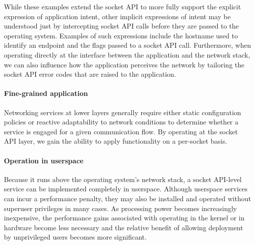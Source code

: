 While these examples extend the socket API to more fully support the 
explicit expression of application intent, other implicit expressions of intent 
may be understood just by intercepting socket API calls before they are passed 
to the operating system. Examples of such expressions include the hostname
used to identify an endpoint and the flags passed to a socket API call.
Furthermore, when operating directly at the interface between the application
and the network stack, we can also influence how the application perceives
the network by tailoring the socket API error codes that are raised to the 
application. 

\paragraph{Fine-grained application}
Networking services at lower layers generally require 
either static configuration policies
or reactive adaptability to network conditions
to determine whether a service is engaged for a given 
communication flow. By operating at the socket API layer, 
we gain the ability to apply functionality 
on a per-socket basis.


\paragraph{Operation in userspace}
Because it runs above the 
operating system's network stack, a socket API-level service 
can be implemented completely in userspace. Although
userspace services can incur a performance penalty, 
they may also be installed and operated without superuser 
privileges in many cases. As processing power becomes 
increasingly inexpensive, the performance gains associated 
with operating in the kernel or in hardware become 
less necessary and the relative benefit of allowing deployment 
by unprivileged users becomes more significant.


\iffalse
\paragraph{Support for legacy applications, hosts, and networks}
To encourage deployment, a service should not require
changes to the code base of an application, the operating system 
of an end host, or the devices and links that make up a network.
By operating outside of these entities, a socket API-level service 
loses the opportunity to leverage application-specific 
or network-specific context (except for the kind 
of context described in Section~\ref{subsubsec-intent}).
However, this enables it to support oblivious applications, 
hosts, and networks, as required for democratic deployment.
\fi


